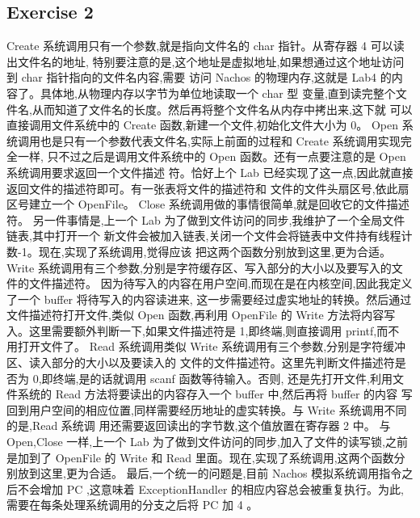 \documentclass[nofonts]{ctexart}
\begin{document}
\subsection*{Exercise 2}

Create 系统调用只有一个参数,就是指向文件名的 char 指针。从寄存器 4 可以读出文件名的地址,
特别要注意的是,这个地址是虚拟地址,如果想通过这个地址访问到 char 指针指向的文件名内容,需要
访问 Nachos 的物理内存,这就是 Lab4 的内容了。具体地,从物理内存以字节为单位地读取一个 char 型
变量,直到读完整个文件名,从而知道了文件名的长度。然后再将整个文件名从内存中拷出来,这下就
可以直接调用文件系统中的 Create 函数,新建一个文件,初始化文件大小为 0。
Open 系统调用也是只有一个参数代表文件名,实际上前面的过程和 Create 系统调用实现完全一样,
只不过之后是调用文件系统中的 Open 函数。还有一点要注意的是 Open 系统调用要求返回一个文件描述
符。恰好上个 Lab 已经实现了这一点,因此就直接返回文件的描述符即可。有一张表将文件的描述符和
文件的文件头扇区号,依此扇区号建立一个 OpenFile。
Close 系统调用做的事情很简单,就是回收它的文件描述符。
另一件事情是,上一个 Lab 为了做到文件访问的同步,我维护了一个全局文件链表,其中打开一个
新文件会被加入链表,关闭一个文件会将链表中文件持有线程计数-1。现在,实现了系统调用,觉得应该
把这两个函数分别放到这里,更为合适。
Write 系统调用有三个参数,分别是字符缓存区、写入部分的大小以及要写入的文件的文件描述符。
因为待写入的内容在用户空间,而现在是在内核空间,因此我定义了一个 buffer 将待写入的内容读进来,
这一步需要经过虚实地址的转换。然后通过文件描述符打开文件,类似 Open 函数,再利用 OpenFile 的
Write 方法将内容写入。这里需要额外判断一下,如果文件描述符是 1,即终端,则直接调用 printf,而不
用打开文件了。
Read 系统调用类似 Write 系统调用有三个参数,分别是字符缓冲区、读入部分的大小以及要读入的
文件的文件描述符。这里先判断文件描述符是否为 0,即终端,是的话就调用 scanf 函数等待输入。否则,
还是先打开文件,利用文件系统的 Read 方法将要读出的内容存入一个 buffer 中,然后再将 buffer 的内容
写回到用户空间的相应位置,同样需要经历地址的虚实转换。与 Write 系统调用不同的是,Read 系统调
用还需要返回读出的字节数,这个值放置在寄存器 2 中。
与 Open,Close 一样,上一个 Lab 为了做到文件访问的同步,加入了文件的读写锁,之前是加到了
OpenFile 的 Write 和 Read 里面。现在,实现了系统调用,这两个函数分别放到这里,更为合适。
最后,一个统一的问题是,目前 Nachos 模拟系统调用指令之后不会增加 PC ,这意味着
ExceptionHandler 的相应内容总会被重复执行。为此,需要在每条处理系统调用的分支之后将 PC 加
4 。
\end{document}
